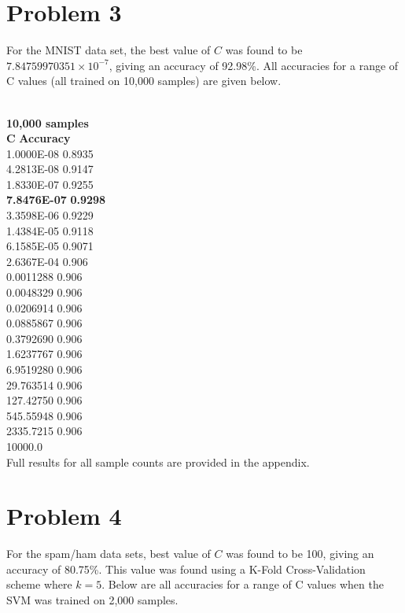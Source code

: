 \documentclass{report}
\newcommand{\tab}{\-\hspace{1.5cm}}
\begin{document}
\section*{Problem 3}

For the MNIST data set, the best value of $C$ was found to be $7.84759970351\times10^{-7}$, giving an accuracy of 92.98\%. All accuracies for a range of C values (all trained on 10,000 samples) are given below.

\-\\
\textbf{10,000 samples}\\
\textbf{C} \tab\tab \textbf{Accuracy}\\
1.0000E-08 \tab 0.8935\\
4.2813E-08 \tab 0.9147\\
1.8330E-07 \tab 0.9255\\
\textbf{7.8476E-07} \tab \textbf{0.9298}\\
3.3598E-06 \tab 0.9229\\
1.4384E-05 \tab 0.9118\\
6.1585E-05 \tab 0.9071\\
2.6367E-04 \tab 0.906\\
0.0011288 \tab 0.906\\
0.0048329 \tab 0.906\\
0.0206914 \tab 0.906\\
0.0885867 \tab 0.906\\
0.3792690 \tab 0.906\\
1.6237767 \tab 0.906\\
6.9519280 \tab 0.906\\
29.763514 \tab 0.906\\
127.42750 \tab 0.906\\
545.55948 \tab 0.906\\
2335.7215 \tab 0.906\\
10000.0 \tab\;\\

Full results for all sample counts are provided in the appendix.


\section*{Problem 4}

For the spam/ham data sets, best value of $C$ was found to be 100, giving an accuracy of 80.75\%. This value was found using a K-Fold Cross-Validation scheme where $k=5$. Below are all accuracies for a range of C values when the SVM was trained on 2,000 samples.
\end{document}
